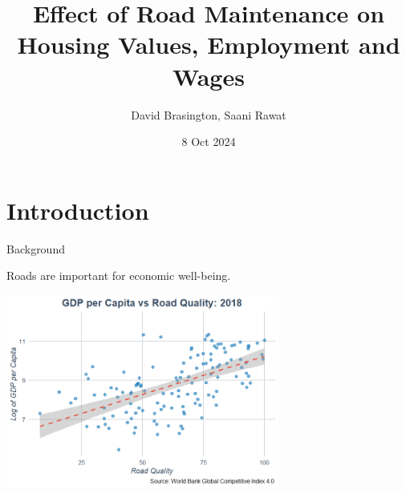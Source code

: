 \documentclass{beamer}
\title[Roads]{Effect of Road Maintenance on Housing Values, Employment and Wages}
\author{David Brasington, Saani Rawat}
\institute{University of Cincinnati}
\date{8 Oct 2024}
\begin{document}
\begin{frame}
\titlepage
\end{frame}








\section{Introduction}

\begin{frame}{Background}

Roads are important for economic well-being.


\includegraphics[width=9cm]{assets/imgs/road_quality_vs_gdp_per_cap.png}

\end{frame} 
\end{document}
